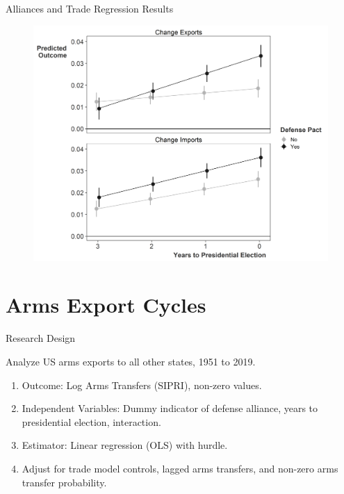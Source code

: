 \documentclass[12pt]{beamer}
\begin{document}
\begin{frame}{Alliances and Trade Regression Results}

\begin{figure}[htbp]
	\centering
		\includegraphics[height=.9\textheight]{us-elec-pred-exim.png}
\end{figure}

\end{frame} 




\section{Arms Export Cycles} 


\begin{frame}{Research Design}

\pause
Analyze US arms exports to all other states, 1951 to 2019. 
\pause
\begin{enumerate}
\item Outcome: Log Arms Transfers (SIPRI), non-zero values. 
\pause
\item Independent Variables: Dummy indicator of defense alliance, years to presidential election, interaction. 
\pause 
\item Estimator: Linear regression (OLS) with hurdle. 
\pause 
\item Adjust for trade model controls, lagged arms transfers, and non-zero arms transfer probability.
\end{enumerate} 

\end{frame} 
\end{document}
